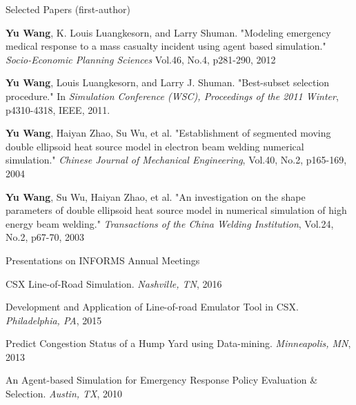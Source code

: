 

\begin{cventries}

\cventry
{Selected Papers (first-author)}      %
{}                            %
{}                                         %
{}                                         %
{
\begin{cvitems} %
    \item {
\textbf{Yu Wang}, K. Louis Luangkesorn, and Larry Shuman. "Modeling emergency medical response to a mass casualty incident using agent based simulation." \textit{Socio-Economic Planning Sciences} Vol.46, No.4, p281-290, 2012
	}
    \item {
\textbf{Yu Wang}, Louis Luangkesorn, and Larry J. Shuman. "Best-subset selection procedure." In 
\textit{Simulation Conference (WSC), Proceedings of the 2011 Winter}, p4310-4318, IEEE, 2011.
	}
	\item {
\textbf{Yu Wang}, Haiyan Zhao, Su Wu, et al. "Establishment of segmented moving double ellipsoid heat source model in electron beam welding numerical simulation." 
\textit{Chinese Journal of Mechanical Engineering}, Vol.40, No.2, p165-169, 2004
	}
    \item {
\textbf{Yu Wang}, Su Wu, Haiyan Zhao, et al. "An investigation on the shape parameters of double ellipsoid heat source model in numerical simulation of high energy beam welding." 
\textit{Transactions of the China Welding Institution}, Vol.24, No.2, p67-70, 2003
	}	
\end{cvitems}
}

\cventry
{Presentations on INFORMS Annual Meetings}      %
{}                            %
{}                                         %
{}                                         %
{
\begin{cvitems} %
    \item {
CSX Line-of-Road Simulation. \textit{Nashville, TN}, 2016
	}
    \item {
Development and Application of Line-of-road Emulator Tool in CSX. \textit{Philadelphia, PA}, 2015
	}
	\item {
Predict Congestion Status of a Hump Yard using Data-mining. \textit{Minneapolis, MN}, 2013
	}
    \item {
An Agent-based Simulation for Emergency Response Policy Evaluation \& Selection. \textit{Austin, TX}, 2010
	}	
\end{cvitems}
}

\end{cventries}
